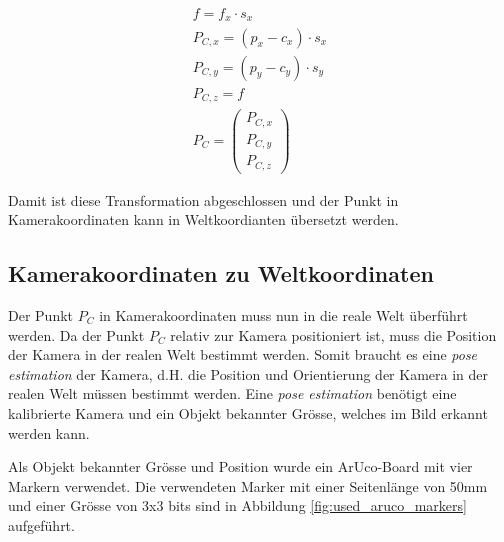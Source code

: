 \begin{align}
f = f_x \cdot s_x\\
P_{C,x} = (p_x - c_x) \cdot s_x\\
P_{C,y} = (p_y - c_y) \cdot s_y\\
P_{C,z} = f\\
P_C = \begin{pmatrix}P_{C,x}\\P_{C,y}\\P_{C,z}\end{pmatrix}
\end{align}


Damit ist diese Transformation abgeschlossen und der Punkt in Kamerakoordinaten kann in Weltkoordianten übersetzt werden.

\subsection{Kamerakoordinaten zu Weltkoordinaten}\label{kap:camera_to_world}

Der Punkt $P_C$ in Kamerakoordinaten muss nun in die reale Welt überführt werden. Da der Punkt $P_C$ relativ zur Kamera
positioniert ist, muss die Position der Kamera in der realen Welt bestimmt werden.
Somit braucht es eine \emph{pose estimation} der Kamera, d.H. die Position und Orientierung der Kamera in der realen Welt müssen bestimmt werden.
Eine \emph{pose estimation} benötigt eine kalibrierte Kamera und ein Objekt bekannter Grösse, welches im Bild erkannt werden kann.

Als Objekt bekannter Grösse und Position wurde ein ArUco-Board \cite{opencv:detection_of_aruco_boards} mit vier Markern verwendet.
Die verwendeten Marker mit einer Seitenlänge von 50\si{\milli\metre} und einer Grösse von 3x3 bits sind
in Abbildung \ref{fig:used_aruco_markers} aufgeführt.

